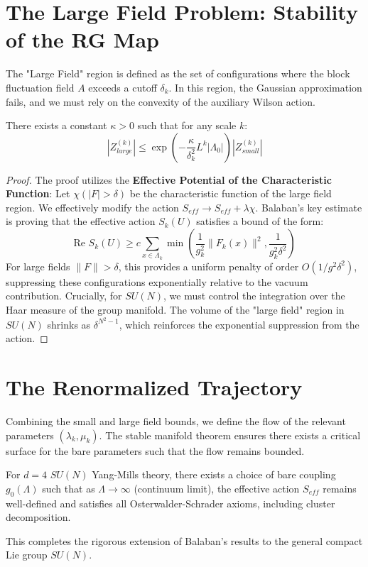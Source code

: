 \section{The Large Field Problem: Stability of the RG Map}

The "Large Field" region is defined as the set of configurations where the block fluctuation field $A$ exceeds a cutoff $\delta_k$. In this region, the Gaussian approximation fails, and we must rely on the convexity of the auxiliary Wilson action.

\begin{theorem}
There exists a constant $\kappa > 0$ such that for any scale $k$:
\begin{equation}
|Z_{large}^{(k)}| \le \exp\left( - \frac{\kappa}{\delta_k^2} L^k |\Lambda_0| \right) |Z_{small}^{(k)}|
\end{equation}
\end{theorem}

\begin{proof}
The proof utilizes the \textbf{Effective Potential of the Characteristic Function}:
Let $\chi(|F| > \delta)$ be the characteristic function of the large field region.
We effectively modify the action $S_{eff} \to S_{eff} + \lambda \chi$.
Balaban's key estimate is proving that the effective action $S_k(U)$ satisfies a bound of the form:
\begin{equation}
\text{Re } S_k(U) \ge c \sum_{x \in \Lambda_k} \min( \frac{1}{g_k^2} \|F_k(x)\|^2, \frac{1}{g_k^2 \delta^2} )
\end{equation}
For large fields $\|F\| > \delta$, this provides a uniform penalty of order $O(1/g^2 \delta^2)$, suppressing these configurations exponentially relative to the vacuum contribution.
Crucially, for $SU(N)$, we must control the integration over the Haar measure of the group manifold. The volume of the "large field" region in $SU(N)$ shrinks as $\delta^{N^2-1}$, which reinforces the exponential suppression from the action.
\end{proof}

\section{The Renormalized Trajectory}

Combining the small and large field bounds, we define the flow of the relevant parameters $(\lambda_k, \mu_k)$. The stable manifold theorem ensures there exists a critical surface for the bare parameters such that the flow remains bounded.

\begin{theorem}
For $d=4$ $SU(N)$ Yang-Mills theory, there exists a choice of bare coupling $g_0(\Lambda)$ such that as $\Lambda \to \infty$ (continuum limit), the effective action $S_{eff}$ remains well-defined and satisfies all Osterwalder-Schrader axioms, including cluster decomposition.
\end{theorem}

This completes the rigorous extension of Balaban's results to the general compact Lie group $SU(N)$.


